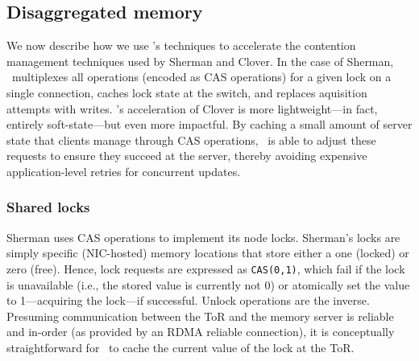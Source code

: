 \subsection{Disaggregated memory}

We now describe how we use \sword's techniques to accelerate the
contention management techniques used by Sherman and Clover.
In the case of Sherman, \sword\ multiplexes all operations (encoded as
CAS operations) for a given lock on a single connection, caches lock
state at the switch, and replaces aquisition attempts with writes.
%
%
\sword's acceleration of Clover is more lightweight---in fact,
entirely soft-state---but even more impactful.  By caching a small
amount of server state that clients manage through CAS operations,
\sword\ is able to adjust these requests to ensure they succeed at the
server, thereby avoiding expensive application-level retries for
concurrent updates.

\subsubsection{Shared locks}
\label{sec:locking-algorithm}

Sherman uses CAS operations to implement its node locks.
%
Sherman's locks are simply specific (NIC-hosted) memory locations that
store either a one (locked) or zero (free).  Hence, lock requests are
expressed as \texttt{CAS(0,1)}, which fail if the lock is unavailable
(i.e., the stored value is currently not 0) or atomically set the
value to 1---acquiring the lock---if successful. Unlock operations are
the inverse.  Presuming communication between the ToR and the memory
server is reliable and in-order (as provided by an RDMA reliable
connection), it is conceptually straightforward for \sword\ to cache
the current value of the lock at the ToR.

